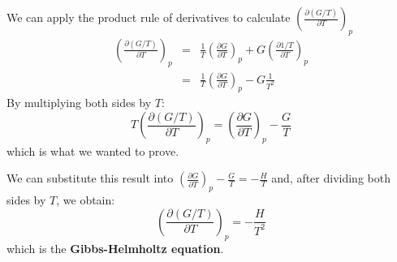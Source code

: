 \documentclass[12pt,a4paper]{report}
\begin{document}
   We can apply the product rule of derivatives to calculate $\left(\frac{\partial (G/T)}{\partial T}\right)_{p}$
   \begin{eqnarray*}
   \left(\frac{\partial (G/T)}{\partial T}\right)_{p} &=& \frac{1}{T} \left(\frac{\partial G}{\partial T}\right)_{p} + G \left(\frac{\partial 1/T}{\partial T}\right)_{p}\\
   &=& \frac{1}{T} \left(\frac{\partial G}{\partial T}\right)_{p} -G \frac{1}{T^{2}}
   \end{eqnarray*}
   By multiplying both sides by $T$:
   \begin{equation*}
   T \left(\frac{\partial (G/T)}{\partial T}\right)_{p} = \left(\frac{\partial G}{\partial T}\right)_{p} - \frac{G}{T}
   \end{equation*}
   which is what we wanted to prove.
   
   We can substitute this result into $\left(\frac{\partial G}{\partial T}\right)_{p} -\frac{G}{T} =-\frac{H}{T}$ and, after dividing both sides by $T$, we obtain:
   \begin{equation*}
   \left(\frac{\partial (G/T)}{\partial T}\right)_{p} = -\frac{H}{T^{2}}
   \end{equation*}
   which is the \textbf{Gibbs-Helmholtz equation}.
\end{document}
